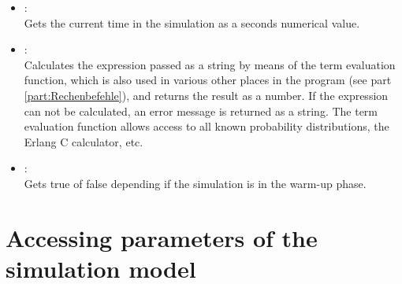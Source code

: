 \begin{itemize}

\item
{}:\\
Gets the current time in the simulation as a seconds numerical value.
  
\item
{}:\\
Calculates the expression passed as a string by means of the term evaluation function,
which is also used in various other places in the program (see part \ref{part:Rechenbefehle}), and returns the result as a  number.
If the expression can not be calculated, an error message is returned as a string.
The term evaluation function allows access to all known probability distributions,
the Erlang C calculator, etc.
  
\item
{}:\\
Gets true of false depending if the simulation is in the warm-up phase.
	
\end{itemize}

\section{Accessing parameters of the simulation model}


